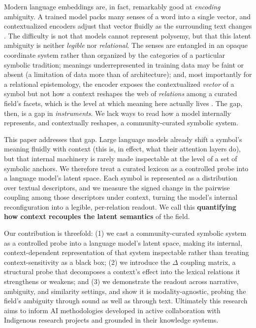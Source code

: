 \documentclass[final,creativeai]{article}
\begin{document}
Modern language embeddings are, in fact, remarkably good at \emph{encoding} ambiguity. A trained model packs many senses of a word into a single vector, and contextualized encoders adjust that vector fluidly as the surrounding text changes \cite{haber_polysemyevidence_2024, loureiro_analysis_2021}. The difficulty is not that models cannot represent polysemy, but that this latent ambiguity is neither \emph{legible} nor \emph{relational}. The senses are entangled in an opaque coordinate system rather than organized by the categories of a particular symbolic tradition; meanings underrepresented in training data may be faint or absent (a limitation of data more than of architecture); and, most importantly for a relational epistemology, the encoder exposes the contextualized \emph{vector} of a symbol but not how a context reshapes the web of \emph{relations} among a curated field's facets, which is the level at which meaning here actually lives \cite{ferrari_identification_2018}. The gap, then, is a gap in \emph{instruments}. We lack ways to read how a model internally represents, and contextually reshapes, a community-curated symbolic system.

This paper addresses that gap. Large language models already shift a symbol's meaning fluidly with context (this is, in effect, what their attention layers do), but that internal machinery is rarely made inspectable at the level of a set of symbolic anchors. We therefore treat a curated lexicon as a controlled probe into a language model's latent space. Each symbol is represented as a distribution over textual descriptors, and we measure the signed change in the pairwise coupling among those descriptors under context, turning the model's internal reconfiguration into a legible, per-relation readout. We call this \textbf{quantifying how context recouples the latent semantics} of the field.

Our contribution is threefold: (1) we cast a community-curated symbolic system as a controlled probe into a language model's latent space, making its internal, context-dependent representation of that system inspectable rather than treating context-sensitivity as a black box; (2) we introduce the $\Delta$ coupling matrix, a structural probe that decomposes a context's effect into the lexical relations it strengthens or weakens; and (3) we demonstrate the readout across narrative, ambiguity, and similarity settings, and show it is modality-agnostic, probing the field's ambiguity through sound as well as through text. Ultimately this research aims to inform AI methodologies developed in active collaboration with Indigenous research projects and grounded in their knowledge systems.
\end{document}
